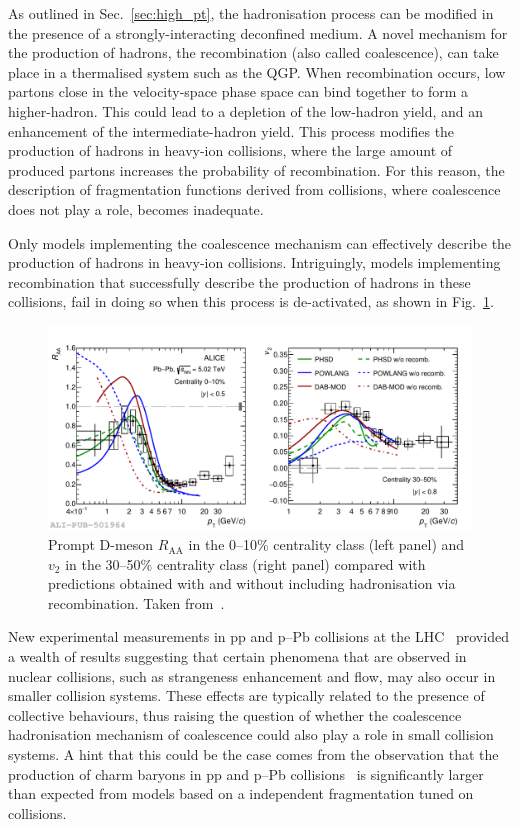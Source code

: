 As outlined in Sec.~\ref{sec:high_pt}, the hadronisation process can be modified in the presence of a strongly-interacting deconfined medium. A novel mechanism for the production of hadrons, the recombination (also called coalescence), can take place in a thermalised system such as the QGP. When recombination occurs, low \pt partons close in the velocity-space phase space can bind together to form a higher-\pt hadron. This could lead to a depletion of the low-\pt hadron yield, and an enhancement of the intermediate-\pt hadron yield. This process modifies the production of hadrons in heavy-ion collisions, where the large amount of produced partons increases the probability of recombination. For this reason, the description of fragmentation functions derived from \ee collisions, where coalescence does not play a role, becomes inadequate. 

Only models implementing the coalescence mechanism can effectively describe the production of hadrons in heavy-ion collisions. Intriguingly, models implementing recombination that successfully describe the production of hadrons in these collisions, fail in doing so when this process is de-activated, as shown in Fig.~\ref{fig:D_recombination}. 

\begin{figure}[htb]
  \centering
  \includegraphics[width=\linewidth]{Figures/Chapter 2/D_Raa010_V23050_FragCoal_3models_1.pdf}
  \caption{Prompt D-meson $R_\mathrm{AA}$ in the 0--10\% centrality class (left panel) and $v_2$ in the 30--50\% centrality class (right panel) compared with predictions obtained with and without including hadronisation via recombination. Taken from~\cite{ALICE:2021rxa}.}
  \label{fig:D_recombination}
\end{figure}

New experimental measurements in pp and p--Pb collisions at the LHC~\cite{ALICE:2016fzo,ALICE:2020wla,ALICE:2024ozd,ALICE:2020wfu,ALICE:2021bli,CMS:2015fgy} provided a wealth of results suggesting that certain phenomena that are observed in nuclear collisions, such as strangeness enhancement and flow, may also occur in smaller collision systems. These effects are typically related to the presence of collective behaviours, thus raising the question of whether the coalescence hadronisation mechanism of coalescence could also play a role in small collision systems. A hint that this could be the case comes from the observation that the production of charm baryons in pp and p--Pb collisions~\cite{ALICE:2022exq,ALICE:2024ozd} is significantly larger than expected from models based on a independent fragmentation tuned on \ee collisions. 

